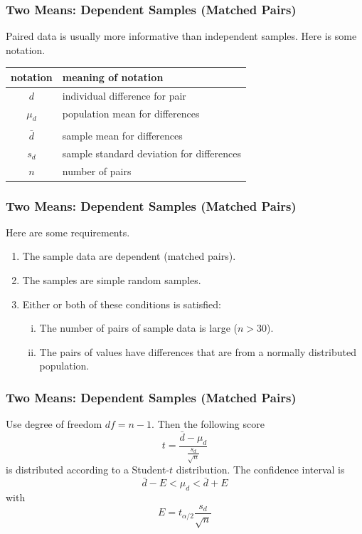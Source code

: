 \documentclass[xcolor=dvipsnames]{beamer}
\begin{document}
\begin{frame}
  \frametitle{Two Means: Dependent Samples (Matched Pairs)}
  Paired data is usually more informative than independent samples. Here is some notation.

\bigskip

  \begin{tabular}{|c|l|}\hline
    \textbf{notation} & \textbf{meaning of notation}              \\ \hline
    $d$               & individual difference for pair            \\ \hline
    $\mu_{d}$         & population mean for differences           \\ \hline
             &                \\
    $\bar{d}$         & sample mean for differences               \\ \hline
    $s_{d}$           & sample standard deviation for differences \\ \hline
    $n$               & number of pairs                           \\ \hline
  \end{tabular}
\end{frame}

\begin{frame}
  \frametitle{Two Means: Dependent Samples (Matched Pairs)}
  Here are some requirements.
  \begin{enumerate}
  \item The sample data are dependent (matched pairs).
  \item The samples are simple random samples.
  \item Either or both of these conditions is satisfied:
    \begin{enumerate}[(i)]
  \item The number of pairs of sample data is large ($n>30$).
  \item The pairs of values have differences that are from a normally distributed population.
    \end{enumerate}
  \end{enumerate}
\end{frame}

\begin{frame}
  \frametitle{Two Means: Dependent Samples (Matched Pairs)}
  Use degree of freedom $df=n-1$. Then the following score
  \begin{equation}
    \label{eq:aebohfuu}
    t=\frac{\bar{d}-\mu_{d}}{\frac{s_{d}}{\sqrt{n}}}
  \end{equation}
is distributed according to a Student-$t$ distribution. The confidence interval is
\begin{equation}
  \label{eq:jaegeeng}
  \bar{d}-E<\mu_{d}<\bar{d}+E
\end{equation}
with
\begin{equation}
  \label{eq:vaepiewu}
  E=t_{\alpha/2}\frac{s_{d}}{\sqrt{n}}
\end{equation}
\end{frame}
\end{document}
